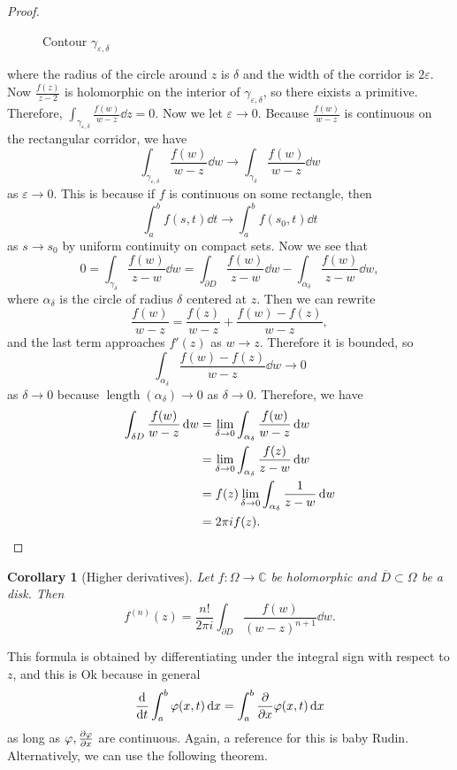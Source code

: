 \documentclass[leqno, openany]{memoir}
\newtheorem{cor}[thm]{Corollary}
\theoremstyle{definition}
\theoremstyle{remark}
\theoremstyle{plain}
\theoremstyle{definition}
\theoremstyle{remark}
\newcommand{\C}{\mathbb{C}}
\newcommand{\ep}{\varepsilon}
\newcommand{\ol}[1]{\overline{#1}}
\DeclareMathOperator{\len}{length}
\begin{document}
\begin{proof}
\begin{figure}[H]
\begin{center}
    \end{center}
    \caption{Contour $\gamma_{\ep, \delta}$}%
    \label{fig:contour}
    \end{figure}
    where the radius of the circle around $z$ is $\delta$ and the width of the corridor is $2\ep$. Now $\frac{f(z)}{z-2}$ is holomorphic on the interior of $\gamma_{\ep, \delta}$, so there eixists a primitive. Therefore, $\int_{\gamma_{\ep, \delta}} \frac{f(w)}{w-z} \dd{z} = 0$. Now we let $\ep \to 0$. Because $\frac{f(w)}{w-z}$ is continuous on the rectangular corridor, we have 
    \[ \int_{\gamma_{\ep, \delta}} \frac{f(w)}{w-z} \dd{w} \to \int_{\gamma_{\delta}} \frac{f(w)}{w-z} \dd{w} \] 
    as $\ep \to 0$. This is because if $f$ is continuous on some rectangle, then
    \[ \int_a^b f(s,t) \dd{t} \to \int_a^b f(s_0, t) \dd{t} \]
    as $s \to s_0$ by uniform continuity on compact sets. Now we see that
    \[ 0 = \int_{\gamma_{\delta}} \frac{f(w)}{z-w} \dd{w} = \int_{\partial D} \frac{f(w)}{z-w} \dd{w} - \int_{\alpha_{\delta}} \frac{f(w)}{z-w} \dd{w}, \]
    where $\alpha_{\delta}$ is the circle of radius $\delta$ centered at $z$. Then we can rewrite
    \[ \frac{f(w)}{w-z} = \frac{f(z)}{w-z} + \frac{f(w) - f(z)}{w-z}, \]
    and the last term approaches $f'(z)$ as $w \to z$. Therefore it is bounded, so
    \[ \int_{\alpha_{\delta}} \frac{f(w) - f(z)}{w-z} \dd{w} \to 0 \]
    as $\delta \to 0$ because $\len(\alpha_{\delta}) \to 0$ as $\delta \to 0$. Therefore, we have
    \begin{align*} 
        \int_{\delta D} \frac{f(w)}{w-z} \dd{w} &= \lim_{\delta \to 0} \int_{\alpha_{\delta}} \frac{f(w)}{w-z} \dd{w} \\
                                                &= \lim_{\delta \to 0} \int_{\alpha_{\delta}} \frac{f(z)}{z-w} \dd{w} \\
                                                &= f(z) \lim_{\delta \to 0} \int_{\alpha_{\delta}} \frac{1}{z-w} \dd{w} \\
                                                &= 2 \pi i f(z). \qedhere
    \end{align*}
\end{proof}

\begin{cor}[Higher derivatives]
    Let $f \colon \Omega \to \C$ be holomorphic and $\ol{D} \subset \Omega$ be a disk. Then
    \[ f^{(n)}(z) = \frac{n!}{2 \pi i} \int_{\partial D} \frac{f(w)}{{(w-z)}^{n+1}} \dd{w}. \]
\end{cor}
This formula is obtained by differentiating under the integral sign with respect to $z$, and this is Ok because in general
\[ \dv{t} \int_a^b \varphi(x,t) \dd{x} = \int_a^b \pdv{x} \varphi(x, t) \dd{x} \]
as long as $\varphi, \pdv{\varphi}{x}$ are continuous. Again, a reference for this is baby Rudin. Alternatively, we can use the following theorem.
\end{document}
